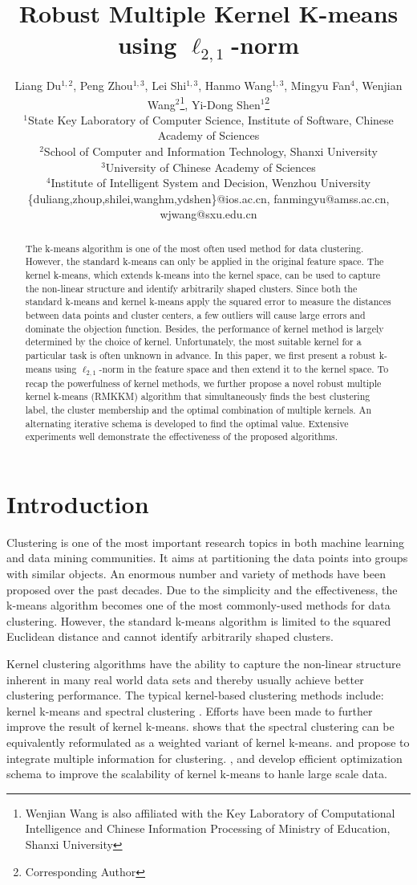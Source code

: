 \documentclass{article}
\title{Robust Multiple Kernel K-means using $\ell_{2,1}$-norm}
\author{Liang Du$^{1,2}$, Peng Zhou$^{1,3}$, Lei Shi$^{1,3}$, Hanmo Wang$^{1,3}$, Mingyu Fan$^{4}$, Wenjian Wang$^{2}$\thanks{Wenjian Wang is also affiliated with the Key Laboratory of Computational Intelligence and Chinese Information Processing of Ministry of Education, Shanxi University}, Yi-Dong Shen$^{1}$\thanks{Corresponding Author} \\
$^{1}$State Key Laboratory of Computer Science, Institute of Software, Chinese Academy of Sciences\\
$^{2}$School of Computer and Information Technology, Shanxi University \\
$^{3}$University of Chinese Academy of Sciences \\
$^{4}$Institute of Intelligent System and Decision, Wenzhou University\\
\{duliang,zhoup,shilei,wanghm,ydshen\}@ios.ac.cn, fanmingyu@amss.ac.cn, wjwang@sxu.edu.cn
}
\begin{document}
\maketitle

\begin{abstract}
The k-means algorithm is one of the most often used method for data clustering. However, the standard k-means can only be applied in the original feature space. The kernel k-means, which extends k-means into the kernel space, can be used to capture the non-linear structure and identify arbitrarily shaped clusters. Since both the standard k-means and kernel k-means apply the squared error to measure the distances between data points and cluster centers, a few outliers will cause large errors and dominate the objection function. Besides, the performance of kernel method is largely determined by the choice of kernel. Unfortunately, the most suitable kernel for a particular task is often unknown in advance. In this paper, we first present a robust k-means using $\ell_{2,1}$-norm in the feature space and then extend it to the kernel space. To recap the powerfulness of kernel methods, we further propose a novel robust multiple kernel k-means (RMKKM) algorithm that simultaneously finds the best clustering label, the cluster membership and the optimal combination of multiple kernels. An alternating iterative schema is developed to find the optimal value. Extensive experiments well demonstrate the effectiveness of the proposed algorithms.
\end{abstract}


\section{Introduction}
Clustering is one of the most important research topics in both machine learning and data mining communities. It aims at partitioning the data points into groups with similar objects. An enormous number and variety of methods have been proposed over the past decades. Due to the simplicity and the effectiveness, the k-means algorithm \cite{wu2008top} becomes one of the most commonly-used methods for data clustering. However, the standard k-means algorithm is limited to the squared Euclidean distance and cannot identify arbitrarily shaped clusters.

Kernel clustering algorithms have the ability to capture the non-linear structure inherent in many real world data sets and thereby usually achieve better clustering performance. The typical kernel-based clustering methods include: kernel k-means \cite{scholkopf1998nonlinear} and spectral clustering \cite{ng2002spectral}. Efforts have been made to further improve the result of kernel k-means. \cite{dhillon2007weighted} shows that the spectral clustering can be equivalently reformulated as a weighted variant of kernel k-means. \cite{yu2012optimized} and \cite{huang2012multiple} propose to integrate multiple information for clustering. \cite{chitta2011approximate}, \cite{chitta2012efficient} and \cite{elgohary2014Embd} develop efficient optimization schema to improve the scalability of kernel k-means to hanle large scale data.
\end{document}

